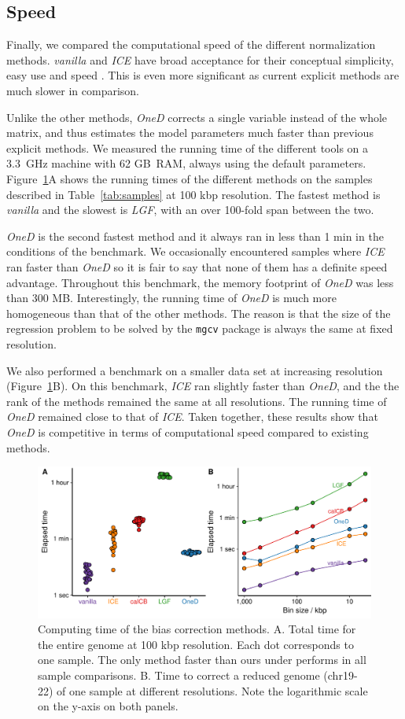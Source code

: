 \documentclass{bioinfo}
\begin{document}
\subsection{Speed}

Finally, we compared the computational speed of the different
normalization methods. \textit{vanilla} and \textit{ICE} have broad
acceptance for their conceptual simplicity, easy use and speed
\citep{imakaev2012iterative}. This is even more significant as current
explicit methods \citep{servant2012hitc} are much slower in comparison.

Unlike the other methods, \textit{OneD} corrects a single variable instead
of the whole matrix, and thus estimates the model parameters much faster
than previous explicit methods. We measured the running time of the
different tools on a 3.3~GHz machine with 62 GB~RAM, always using the
default parameters. Figure~\ref{fig:times}A shows the running times of the
different methods on the samples described in Table~\ref{tab:samples} at
100 kbp resolution. The fastest method is \textit{vanilla} and the slowest
is \textit{LGF}, with an over 100-fold span between the two.

\textit{OneD} is the second fastest method and it always ran in less than
1 min in the conditions of the benchmark. We occasionally encountered
samples where \textit{ICE} ran faster than \textit{OneD} so it is fair to
say that none of them has a definite speed advantage. Throughout this
benchmark, the memory footprint of \textit{OneD} was less than 300 MB.
Interestingly, the running time of \textit{OneD} is much more homogeneous
than that of the other methods. The reason is that the size of the
regression problem to be solved by the \texttt{mgcv} package is always the
same at fixed resolution.

We also performed a benchmark on a smaller data set at increasing
resolution (Figure~\ref{fig:times}B). On this benchmark, \textit{ICE} ran
slightly faster than \textit{OneD}, and the the rank of the methods
remained the same at all resolutions. The running time of \textit{OneD}
remained close to that of \textit{ICE}. Taken together, these results show
that \textit{OneD} is competitive in terms of computational speed compared
to existing methods.

\begin{figure}
\centerline{\includegraphics[width=.5\textwidth]
  {img/figure_benchmark_time.pdf}}
\caption{
Computing time of the bias correction methods. A. Total time for the
entire genome at 100 kbp resolution. Each dot corresponds to one sample.
The only method faster than ours under performs in all sample comparisons.
B. Time to correct a reduced genome (chr19-22) of one sample at different
resolutions. Note the logarithmic scale on the y-axis on both panels.}
\label{fig:times}
\end{figure}
\end{document}
